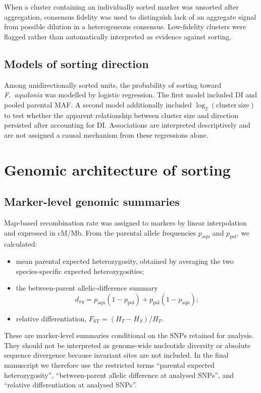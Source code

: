 \documentclass[11pt]{article}
\newcommand{\Faq}{\textit{F.~aquilonia}}
\begin{document}
When a cluster containing an individually sorted marker was unsorted after
aggregation, consensus fidelity was used to distinguish lack of an aggregate
signal from possible dilution in a heterogeneous consensus. Low-fidelity
clusters were flagged rather than automatically interpreted as evidence against
sorting.

\subsection{Models of sorting direction}

Among unidirectionally sorted units, the probability of sorting toward \Faq{}
was modelled by logistic regression. The first model included DI and pooled
parental MAF. A second model additionally included
\(\log_2(\mathrm{cluster\ size})\) to test whether the apparent relationship
between cluster size and direction persisted after accounting for DI.
Associations are interpreted descriptively and are not assigned a causal
mechanism from these regressions alone.

\section{Genomic architecture of sorting}

\subsection{Marker-level genomic summaries}

Map-based recombination rate was assigned to markers by linear interpolation
and expressed in cM/Mb. From the parental allele frequencies
\(p_{\mathrm{aqu}}\) and \(p_{\mathrm{pol}}\), we calculated:
\begin{itemize}
  \item mean parental expected heterozygosity, obtained by averaging the two
        species-specific expected heterozygosities;
  \item the between-parent allelic-difference summary
  \[
    d_{xy}=p_{\mathrm{aqu}}(1-p_{\mathrm{pol}})
          +p_{\mathrm{pol}}(1-p_{\mathrm{aqu}});
  \]
  \item relative differentiation,
        \(F_{\mathrm{ST}}=(H_T-H_S)/H_T\).
\end{itemize}

These are marker-level summaries conditional on the SNPs retained for analysis.
They should not be interpreted as genome-wide nucleotide diversity or absolute
sequence divergence because invariant sites are not included. In the final
manuscript we therefore use the restricted terms ``parental expected
heterozygosity'', ``between-parent allelic difference at analysed SNPs'', and
``relative differentiation at analysed SNPs''.
\end{document}
